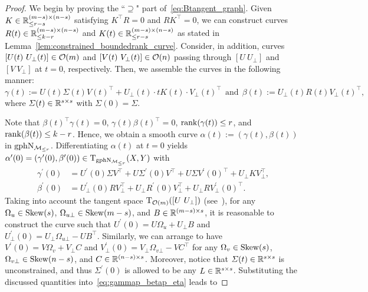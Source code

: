\begin{proof}
We begin by proving the ``$\supseteq$" part of~\eqref{eq:Btangent_graph}. Given $K\in\mathbb{R}^{(m-s)\times(n-s)}_{\le r-s}$ satisfying $K^\top R=0$ and $RK^\top=0$, we can construct curves $R(t)\in\mathbb{R}^{(m-s)\times(n-s)}_{\le k-r}$ and $K(t)\in\mathbb{R}^{(m-s)\times(n-s)}_{\le r-s}$ as stated in Lemma~\ref{lem:constrained_boundedrank_curve}. Consider, in addition, curves $[U(t)\ U_\bot(t)]\in\orth(m)$ and $[V(t)\ V_\bot(t)]\in\orth(n)$ passing through $[U\ U_\bot]$ and $[V\ V_\bot]$ at $t=0$, respectively. Then, we assemble the curves in the following manner:
$$\gamma(t):=U(t)\varSigma(t)V(t)^\top+U_\bot(t)\cdot tK(t)\cdot V_\bot(t)^\top\ \ \text{and}\ \  \beta(t):=U_\bot(t)R(t)V_\bot(t)^\top,$$
where $\varSigma(t)\in\mathbb{R}^{s\times s}$ with $\varSigma(0)=\varSigma$. 

Note that $\beta(t)^\top \gamma(t)=0$, $\gamma(t)\beta(t)^\top=0$, $\operatorname{rank}(\gamma(t))\le r$, and $\operatorname{rank}(\beta(t))\le k-r$. Hence, we obtain a smooth curve $\alpha(t):=(\gamma(t),\beta(t))$ in $\mathrm{gph}\mathrm{N}_{\mathcal{M}_{\le r}}$. Differentiating $\alpha(t)$ at $t=0$ yields $\alpha^\prime(0)=(\gamma^\prime(0),\beta^\prime(0))\in\mathrm{T}_{\mathrm{gph}\mathrm{N}_{\mathcal{M}_{\le r}}}(X,Y)$ with
\begin{equation}\label{eq:gammap_betap_eta}
    \begin{aligned}
    \gamma^\prime(0) &= U^\prime(0)\varSigma V^\top + U\varSigma^\prime(0)V^\top + U\varSigma V^\prime(0)^\top+U_{\bot}KV_{\bot}^\top,
    \\
    \beta^\prime(0) &= U_{\bot}^\prime(0)RV_{\bot}^\top + U_{\bot} R^\prime(0)V_{\bot}^\top + U_{\bot} RV_{\bot}^\prime(0)^\top.
    \end{aligned}
\end{equation}
Taking into account the tangent space $\tangent_{\orth(m)}([U\ U_\bot])$ (see~\cite[\S3.5]{absil2008optimization}), for any $\Omega_u\in\mathrm{Skew}(s)$, $\Omega_{u\bot}\in\mathrm{Skew}(m-s)$, and $B\in\mathbb{R}^{(m-s)\times s}$, it is reasonable to construct the curve such that $U^\prime(0)=U\Omega_u+U_\bot B$ and $U_\bot^\prime(0)=U_\bot \Omega_{u\bot}-UB^\top$. Similarly, we can arrange to have $V^\prime(0)=V\Omega_v+V_\bot C$ and $V_\bot^\prime(0)=V_\bot\Omega_{v\bot}-VC^\top$ for any $\Omega_v\in\mathrm{Skew}(s)$, $\Omega_{v\bot}\in\mathrm{Skew}(n-s)$, and $C\in\mathbb{R}^{(n-s)\times s}$. Moreover, notice that $\varSigma(t)\in\mathbb{R}^{s\times s}$ is unconstrained, and thus $\varSigma^\prime(0)$ is allowed to be any $L\in\mathbb{R}^{s\times s}$. Substituting the discussed quantities into~\eqref{eq:gammap_betap_eta} leads to

\end{proof}
